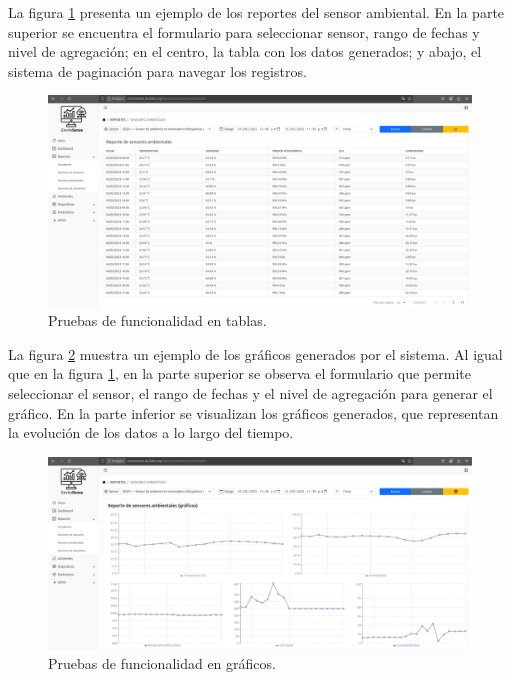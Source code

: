 La figura \ref{fig:tabla} presenta un ejemplo de los reportes del sensor
ambiental. En la parte superior se encuentra el formulario para seleccionar
sensor, rango de fechas y nivel de agregación; en el centro, la tabla con los
datos generados; y abajo, el sistema de paginación para navegar los registros.

\begin{figure}[H]
    \centering
    \includegraphics[width=\textwidth]{Images/45_tabla.png}
    \caption[Pruebas de funcionalidad en tablas]{Pruebas de funcionalidad en tablas.}
    \label{fig:tabla}
\end{figure}

La figura \ref{fig:grafico} muestra un ejemplo de los gráficos generados por el
sistema. Al igual que en la figura \ref{fig:tabla}, en la parte superior se
observa el formulario que permite seleccionar el sensor, el rango de fechas y
el nivel de agregación para generar el gráfico. En la parte inferior se
visualizan los gráficos generados, que representan la evolución de los datos a
lo largo del tiempo.

\begin{figure}[H]
    \centering
    \includegraphics[width=\textwidth]{Images/46_grafico.png}
    \caption[Pruebas de funcionalidad en gráficos]{Pruebas de funcionalidad en gráficos.}
    \label{fig:grafico}
\end{figure}

